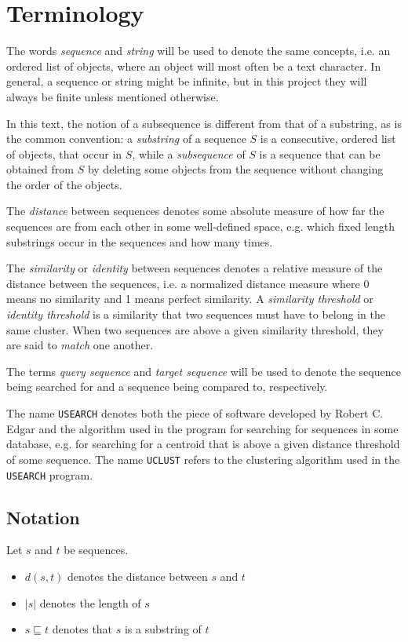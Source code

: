 \section{Terminology}

The words \emph{sequence} and \emph{string} will be used to denote the same
concepts, i.e. an ordered list of objects, where an object will most often be a
text character. In general, a sequence or string might be infinite, but in this
project they will always be finite unless mentioned otherwise.

In this text, the notion of a subsequence is different from that of a
substring, as is the common convention: a \emph{substring} of a sequence $S$ is
a consecutive, ordered list of objects, that occur in $S$, while a
\emph{subsequence} of $S$ is a sequence that can be obtained from $S$ by
deleting some objects from the sequence without changing the order of the
objects.

The \emph{distance} between sequences denotes some absolute measure of how far
the sequences are from each other in some well-defined space, e.g. which fixed
length substrings occur in the sequences and how many times.

The \emph{similarity} or \emph{identity} between sequences denotes a relative
measure of the distance between the sequences, i.e. a normalized distance
measure where 0 means no similarity and 1 means perfect similarity. A
\emph{similarity threshold} or \emph{identity threshold} is a similarity that
two sequences must have to belong in the same cluster.  When two sequences are
above a given similarity threshold, they are said to \emph{match} one another.

The terms \emph{query sequence} and \emph{target sequence} will be used to
denote the sequence being searched for and a sequence being compared to,
respectively.

The name \texttt{USEARCH} denotes both the piece of software developed by
Robert C. Edgar and the algorithm used in the program for searching for
sequences in some database, e.g. for searching for a centroid that is above a
given distance threshold of some sequence. The name \texttt{UCLUST} refers to
the clustering algorithm used in the \texttt{USEARCH} program.


\subsection{Notation}

Let $s$ and $t$ be sequences.
\begin{itemize}
  \item $d(s,t)$ denotes the distance between $s$ and $t$
  \item $|s|$ denotes the length of $s$
  \item $s \sqsubseteq t$ denotes that $s$ is a substring of $t$
\end{itemize}
